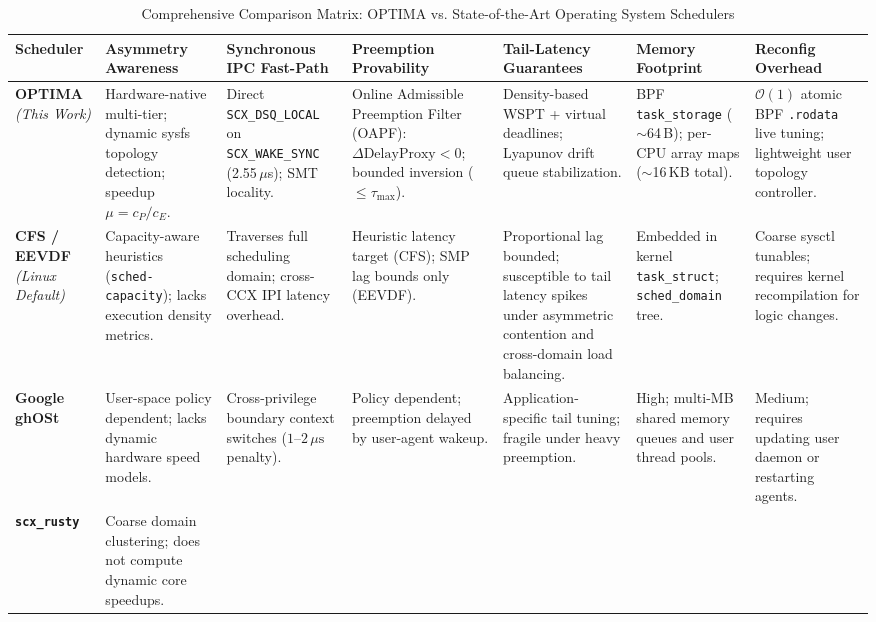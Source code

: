 \documentclass[conference]{IEEEtran}
\begin{document}
\begin{table}[t]
\centering
\scriptsize
\renewcommand{\arraystretch}{0.88}
\caption{Comprehensive Comparison Matrix: OPTIMA vs. State-of-the-Art Operating System Schedulers}
\label{tab:comparison_matrix}
\begin{tabularx}{\textwidth}{l X X X X X X}
\toprule
\textbf{Scheduler} & \textbf{Asymmetry Awareness} & \textbf{Synchronous IPC Fast-Path} & \textbf{Preemption Provability} & \textbf{Tail-Latency Guarantees} & \textbf{Memory Footprint} & \textbf{Reconfig Overhead} \\
\midrule
\textbf{OPTIMA} \newline \textit{(This Work)} & 
Hardware-native multi-tier; dynamic sysfs topology detection; speedup $\mu = c_P/c_E$. & 
Direct \texttt{SCX\_DSQ\_LOCAL} on \texttt{SCX\_WAKE\_SYNC} (2.55\,$\mu$s); SMT locality. & 
Online Admissible Preemption Filter (OAPF): $\Delta\mathrm{DelayProxy} < 0$; bounded inversion ($\le \tau_{\max}$). & 
Density-based WSPT + virtual deadlines; Lyapunov drift queue stabilization. & 
BPF \texttt{task\_storage} ($\sim$64\,B); per-CPU array maps ($\sim$16\,KB total). & 
$\mathcal{O}(1)$ atomic BPF \texttt{.rodata} live tuning; lightweight user topology controller. \\
\textbf{CFS / EEVDF} \newline \textit{(Linux Default)} & 
Capacity-aware heuristics (\texttt{sched-capacity}); lacks execution density metrics. & 
Traverses full scheduling domain; cross-CCX IPI latency overhead. & 
Heuristic latency target (CFS); SMP lag bounds only (EEVDF). & 
Proportional lag bounded; susceptible to tail latency spikes under asymmetric contention and cross-domain load balancing. & 
Embedded in kernel \texttt{task\_struct}; \texttt{sched\_domain} tree. & 
Coarse sysctl tunables; requires kernel recompilation for logic changes. \\
\textbf{Google ghOSt} \newline \cite{humphries2021ghost} & 
User-space policy dependent; lacks dynamic hardware speed models. & 
Cross-privilege boundary context switches ($1\text{--}2\,\mu\text{s}$ penalty). & 
Policy dependent; preemption delayed by user-agent wakeup. & 
Application-specific tail tuning; fragile under heavy preemption. & 
High; multi-MB shared memory queues and user thread pools. & 
Medium; requires updating user daemon or restarting agents. \\
\textbf{\texttt{scx\_rusty}} \newline \cite{hodges2024schedextscale} & 
Coarse domain clustering; does not compute dynamic core speedups. & 

\end{tabularx}
\end{table}
\end{document}
